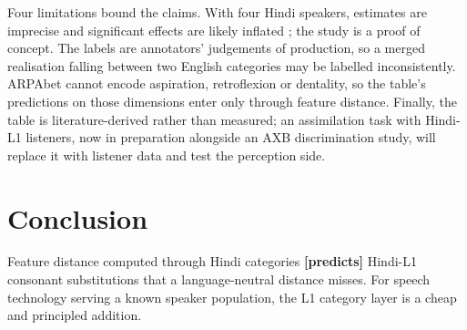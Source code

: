 \documentclass[a4paper,11pt,twocolumn]{article}
\newcommand{\res}[1]{\textbf{[#1]}} %
\begin{document}
Four limitations bound the claims. With four Hindi speakers, estimates are imprecise and significant effects are likely inflated \cite{KirbySonderegger:2018}; the study is a proof of concept. The labels are annotators' judgements of production, so a merged realisation falling between two English categories may be labelled inconsistently. ARPAbet cannot encode aspiration, retroflexion or dentality, so the table's predictions on those dimensions enter only through feature distance. Finally, the table is literature-derived rather than measured; an assimilation task with Hindi-L1 listeners, now in preparation alongside an AXB discrimination study, will replace it with listener data and test the perception side.

\section{Conclusion}

Feature distance computed through Hindi categories \res{predicts} Hindi-L1 consonant substitutions that a language-neutral distance misses. For speech technology serving a known speaker population, the L1 category layer is a cheap and principled addition.




\theendnotes
\end{document}
